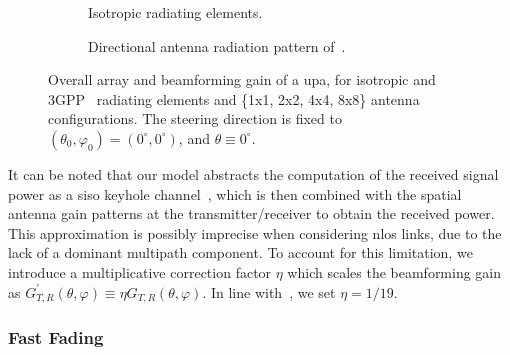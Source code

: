  \begin{figure}
  \centering
  \begin{subfigure}[t]{\columnwidth}
    \centering 
    \setlength{}
    \setlength{}
    
    \caption{Isotropic radiating elements.}
    \vspace*{2mm}
    \label{fig:pattern_iso}
  \end{subfigure}
 \hfill
  \begin{subfigure}[t]{\columnwidth}
    \centering 
    \setlength{}
    \setlength{}
    
    \caption{Directional antenna radiation pattern of~\cite[Section~7.3]{TR38901}.}
    \label{fig:pattern_3gpp}
  \end{subfigure}
  \caption{Overall array and beamforming gain of a \gls{upa}, for isotropic and 3GPP~\cite[Section~7.3]{TR38901} radiating elements and \{1x1, 2x2, 4x4, 8x8\} antenna configurations. The steering direction is fixed to $\left(\theta_0, \varphi_0\right) = (0^{\circ}, 0^{\circ})$, and $\theta \equiv 0^{\circ}$.}
  \label{Fig:rad_pattern}
\end{figure}

It can be noted that our model abstracts the computation of the received signal power as a \gls{siso} keyhole channel~\cite{chizhik2000capacities}, which is then combined with the spatial antenna gain
patterns at the transmitter/receiver to obtain the received power. This approximation is possibly imprecise when considering \gls{nlos} links, due to the lack of a dominant multipath component. To account for this limitation, we introduce a multiplicative correction factor $\eta$ which scales the beamforming gain as $G^{'}_{T, R}(\theta, \varphi) \equiv \eta G_{T, R}(\theta, \varphi) $. In line with~\cite{kulkarni2018correction}, we set $\eta = 1 / 19$.

\subsubsection{Fast Fading}

